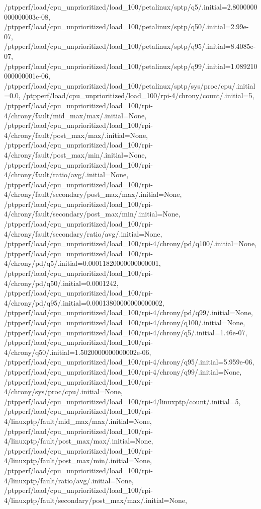 {    /ptpperf/load/cpu_unprioritized/load_100/petalinux/sptp/q5/.initial=2.8000000000000003e-08,
    /ptpperf/load/cpu_unprioritized/load_100/petalinux/sptp/q50/.initial=2.99e-07,
    /ptpperf/load/cpu_unprioritized/load_100/petalinux/sptp/q95/.initial=8.4085e-07,
    /ptpperf/load/cpu_unprioritized/load_100/petalinux/sptp/q99/.initial=1.089210000000001e-06,
    /ptpperf/load/cpu_unprioritized/load_100/petalinux/sptp/sys/proc/cpu/.initial=0.0,
    /ptpperf/load/cpu_unprioritized/load_100/rpi-4/chrony/count/.initial=5,
    /ptpperf/load/cpu_unprioritized/load_100/rpi-4/chrony/fault/mid_max/max/.initial=None,
    /ptpperf/load/cpu_unprioritized/load_100/rpi-4/chrony/fault/post_max/max/.initial=None,
    /ptpperf/load/cpu_unprioritized/load_100/rpi-4/chrony/fault/post_max/min/.initial=None,
    /ptpperf/load/cpu_unprioritized/load_100/rpi-4/chrony/fault/ratio/avg/.initial=None,
    /ptpperf/load/cpu_unprioritized/load_100/rpi-4/chrony/fault/secondary/post_max/max/.initial=None,
    /ptpperf/load/cpu_unprioritized/load_100/rpi-4/chrony/fault/secondary/post_max/min/.initial=None,
    /ptpperf/load/cpu_unprioritized/load_100/rpi-4/chrony/fault/secondary/ratio/avg/.initial=None,
    /ptpperf/load/cpu_unprioritized/load_100/rpi-4/chrony/pd/q100/.initial=None,
    /ptpperf/load/cpu_unprioritized/load_100/rpi-4/chrony/pd/q5/.initial=0.00011820000000000001,
    /ptpperf/load/cpu_unprioritized/load_100/rpi-4/chrony/pd/q50/.initial=0.0001242,
    /ptpperf/load/cpu_unprioritized/load_100/rpi-4/chrony/pd/q95/.initial=0.00013800000000000002,
    /ptpperf/load/cpu_unprioritized/load_100/rpi-4/chrony/pd/q99/.initial=None,
    /ptpperf/load/cpu_unprioritized/load_100/rpi-4/chrony/q100/.initial=None,
    /ptpperf/load/cpu_unprioritized/load_100/rpi-4/chrony/q5/.initial=1.46e-07,
    /ptpperf/load/cpu_unprioritized/load_100/rpi-4/chrony/q50/.initial=1.5020000000000002e-06,
    /ptpperf/load/cpu_unprioritized/load_100/rpi-4/chrony/q95/.initial=5.959e-06,
    /ptpperf/load/cpu_unprioritized/load_100/rpi-4/chrony/q99/.initial=None,
    /ptpperf/load/cpu_unprioritized/load_100/rpi-4/chrony/sys/proc/cpu/.initial=None,
    /ptpperf/load/cpu_unprioritized/load_100/rpi-4/linuxptp/count/.initial=5,
    /ptpperf/load/cpu_unprioritized/load_100/rpi-4/linuxptp/fault/mid_max/max/.initial=None,
    /ptpperf/load/cpu_unprioritized/load_100/rpi-4/linuxptp/fault/post_max/max/.initial=None,
    /ptpperf/load/cpu_unprioritized/load_100/rpi-4/linuxptp/fault/post_max/min/.initial=None,
    /ptpperf/load/cpu_unprioritized/load_100/rpi-4/linuxptp/fault/ratio/avg/.initial=None,
    /ptpperf/load/cpu_unprioritized/load_100/rpi-4/linuxptp/fault/secondary/post_max/max/.initial=None,
}
